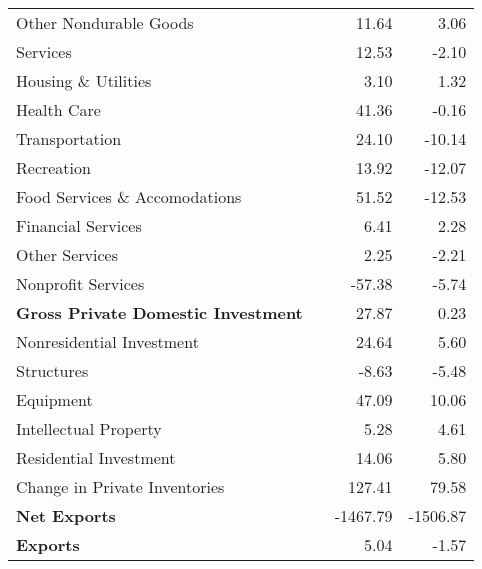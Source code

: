 \documentclass[11pt, letterpaper]{article}\usepackage[]{graphicx}\usepackage[]{color}
\begin{document}
\begin{table}[H]
\begin{tabular}{lrrr}
  \hspace{24mm}  Other Nondurable Goods &  & 11.64 & 3.06 \\ 
  \hspace{8mm}  Services &  & 12.53 & -2.10 \\ 
  \hspace{16mm}  Housing \& Utilities &  & 3.10 & 1.32 \\ 
  \hspace{16mm}  Health Care &  & 41.36 & -0.16 \\ 
  \hspace{16mm}  Transportation &  & 24.10 & -10.14 \\ 
  \hspace{16mm}  Recreation &  & 13.92 & -12.07 \\ 
  \hspace{16mm}  Food Services \& Accomodations &  & 51.52 & -12.53 \\ 
  \hspace{16mm}  Financial Services &  & 6.41 & 2.28 \\ 
  \hspace{16mm}  Other Services &  & 2.25 & -2.21 \\ 
  \hspace{16mm}  Nonprofit Services &  & -57.38 & -5.74 \\ 
  \hspace{0mm} \textbf{Gross Private Domestic Investment} &  & 27.87 & 0.23 \\ 
  \hspace{8mm}  Nonresidential Investment &  & 24.64 & 5.60 \\ 
  \hspace{16mm}  Structures &  & -8.63 & -5.48 \\ 
  \hspace{16mm}  Equipment &  & 47.09 & 10.06 \\ 
  \hspace{16mm}  Intellectual Property &  & 5.28 & 4.61 \\ 
  \hspace{8mm}  Residential Investment &  & 14.06 & 5.80 \\ 
  \hspace{8mm}  Change in Private Inventories &  & 127.41 & 79.58 \\ 
  \hspace{0mm} \textbf{Net Exports} &  & -1467.79 & -1506.87 \\ 
  \hspace{0mm} \textbf{Exports} &  & 5.04 & -1.57 \\ 

\end{tabular}
\end{table}
\end{document}
